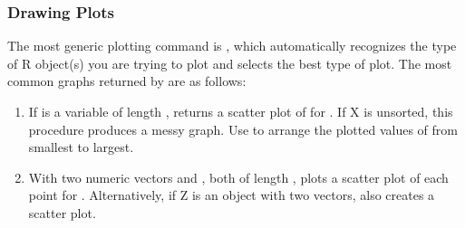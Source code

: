 \documentclass[letterpaper,10pt,english]{sphinxmanual}
\begin{document}
\subsubsection{Drawing Plots}
\label{docs/user_guide:drawing-plots}
The most generic plotting command is , which automatically
recognizes the type of R object(s) you are trying to plot and selects
the best type of plot. The most common graphs returned by  are
as follows:
\begin{enumerate}
\item {} 
If  is a variable of length ,  returns a
scatter plot of  for . If X is
unsorted, this procedure produces a messy graph. Use
 to arrange the plotted values of 
from smallest to largest.

\item {} 
With two numeric vectors  and , both of length ,
 plots a scatter plot of each point 
for . Alternatively, if Z is an object with two
vectors,  also creates a scatter plot.

\end{enumerate}
\end{document}
